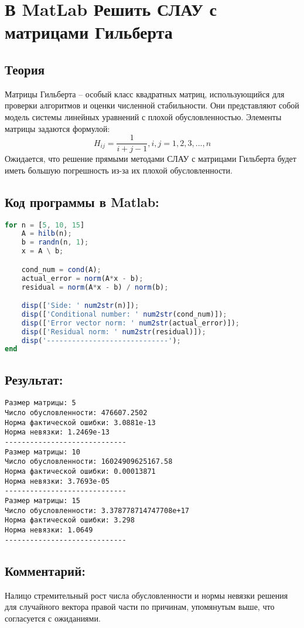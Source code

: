 \clearpage
\section{В MatLab Решить СЛАУ с матрицами Гильберта}
\subsection{Теория}
Матрицы Гильберта -- особый класс квадратных матриц, использующийся для проверки алгоритмов и оценки численной стабильности. Они представляют собой модель системы линейных уравнений с плохой обусловленностью. Элементы матрицы задаются формулой:
\begin{equation}
    H_{ij}={\frac {1}{i+j-1}},i,j=1,2,3,...,n
\end{equation}
Ожидается, что решение прямыми методами СЛАУ с матрицами Гильберта будет иметь большую погрешность из-за их плохой обусловленности.
\subsection{Код программы в Matlab:}
\begin{lstlisting}[language=octave]
for n = [5, 10, 15]
    A = hilb(n);
    b = randn(n, 1);
    x = A \ b;

    cond_num = cond(A);
    actual_error = norm(A*x - b);
    residual = norm(A*x - b) / norm(b);

    disp(['Side: ' num2str(n)]);
    disp(['Conditional number: ' num2str(cond_num)]);
    disp(['Error vector norm: ' num2str(actual_error)]);
    disp(['Residual norm: ' num2str(residual)]);
    disp('-----------------------------');
end
\end{lstlisting}
\subsection{Результат:}
{\singlespacing
\begin{verbatim}
Размер матрицы: 5
Число обусловленности: 476607.2502
Норма фактической ошибки: 3.0881e-13
Норма невязки: 1.2469e-13
-----------------------------
Размер матрицы: 10
Число обусловленности: 16024909625167.58
Норма фактической ошибки: 0.00013871
Норма невязки: 3.7693e-05
-----------------------------
Размер матрицы: 15
Число обусловленности: 3.378778714747708e+17
Норма фактической ошибки: 3.298
Норма невязки: 1.0649
-----------------------------
\end{verbatim}}
\subsection{Комментарий:}
Налицо стремительный рост числа обусловленности и нормы невязки решения для случайного вектора правой части по причинам, упомянутым выше, что согласуется с ожиданиями.

